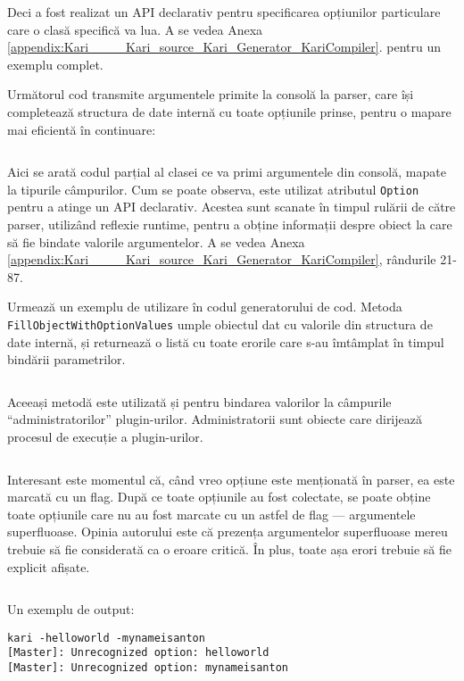\documentclass[a4paper,12pt]{report}
\begin{document}
Deci a fost realizat un \ac{API} declarativ pentru specificarea opțiunilor particulare care o clasă specifică va lua.
A se vedea Anexa \ref{appendix:Kari____Kari_source_Kari_Generator_KariCompiler}.
pentru un exemplu complet.

Următorul cod transmite argumentele primite la consolă la parser, care își completează structura de date internă cu toate opțiunile prinse, pentru o mapare mai eficientă în continuare:
\inputminted[firstline=126, lastline=132]{cs}{../Kari/source/Kari.Generator/KariCompiler.cs}

Aici se arată codul parțial al clasei ce va primi argumentele din consolă, mapate la tipurile câmpurilor.
Cum se poate observa, este utilizat atributul \texttt{Option} pentru a atinge un \ac{API} declarativ.
Acestea sunt scanate în timpul rulării de către parser, utilizând reflexie runtime, pentru a obține informații despre obiect la care să fie bindate valorile argumentelor.
A se vedea Anexa \ref{appendix:Kari____Kari_source_Kari_Generator_KariCompiler}, rândurile 21-87.

Urmează un exemplu de utilizare în codul generatorului de cod.
Metoda \texttt{FillObjectWithOptionValues} umple obiectul dat cu valorile din structura de date internă, și returnează o listă cu toate erorile care s-au îmtâmplat în timpul bindării parametrilor.
\inputminted[firstline=147, lastline=155]{cs}{../Kari/source/Kari.Generator/KariCompiler.cs}

Aceeași metodă este utilizată și pentru bindarea valorilor la câmpurile ``administratorilor'' plugin-urilor.
Administratorii sunt obiecte care dirijează procesul de execuție a plugin-urilor.
\inputminted[firstline=208, lastline=221]{cs}{../Kari/source/Kari.GeneratorCore/Workflow/MasterEnvironment.cs}


Interesant este momentul că, când vreo opțiune este menționată în parser, ea este marcată cu un flag.
După ce toate opțiunile au fost colectate, se poate obține toate opțiunile care nu au fost marcate cu un astfel de flag --- argumentele superfluoase.
Opinia autorului este că prezența argumentelor superfluoase mereu trebuie să fie considerată ca o eroare critică.
În plus, toate așa erori trebuie să fie explicit afișate.
\inputminted[firstline=446, lastline=460]{cs}{../Kari/source/Kari.Generator/KariCompiler.cs}

Un exemplu de output:

\begin{verbatim}
kari -helloworld -mynameisanton
[Master]: Unrecognized option: helloworld
[Master]: Unrecognized option: mynameisanton
\end{verbatim}
\end{document}
